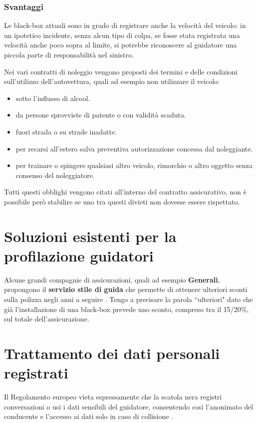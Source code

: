 \documentclass[12pt, a4paper, italian]{report}
\numberwithin{figure}{chapter}
\numberwithin{table}{chapter}
\begin{document}
\subsubsection{Svantaggi}
Le black-box attuali sono in grado di registrare anche la velocità del veicolo: in un ipotetico incidente, senza alcun tipo di colpa, se fosse stata registrata una velocità anche poco sopra al limite, si potrebbe riconoscere al guidatore una piccola parte di responsabilità nel sinistro.

\vspace{1cm}

Nei vari contratti di noleggio \cite{hertz_pdf} vengono proposti dei termini e delle condizioni sull'utilizzo dell'autovettura, quali ad esempio non utilizzare il veicolo: 
\begin{itemize}
    \item  sotto l'influsso di alcool.
    \item da persone sprovviste di patente o con validità scaduta.
    \item fuori strada o su strade inadatte.
    \item per recarsi all'estero salva preventiva autorizzazione concessa dal noleggiante.
    \item per trainare o spingere qualsiasi altro veicolo, rimorchio o altro oggetto senza consenso del noleggiatore.
\end{itemize}
Tutti questi obblighi vengono citati all'interno del contratto assicurativo, non è possibile però stabilire se uno tra questi divieti non dovesse essere rispettato.

\section{Soluzioni esistenti per la profilazione guidatori}
Alcune grandi compagnie di assicurazioni, quali ad esempio \textbf{Generali}, propongono il \textbf{servizio stile di guida} che permette di ottenere ulteriori sconti sulla polizza negli anni a seguire \cite{Generali}. Tengo a precisare la parola ``ulteriori" dato che già l'installazione di una black-box prevede uno sconto, compreso tra il 15/20\%, sul totale dell'assicurazione.

\section{Trattamento dei dati personali registrati}
Il Regolamento europeo vieta espressamente che la scatola nera registri conversazioni o usi i dati sensibili del guidatore, consentendo così l’anonimato del conducente e l’accesso ai dati solo in caso di collisione \cite{RegolamentoEU}.
\end{document}
